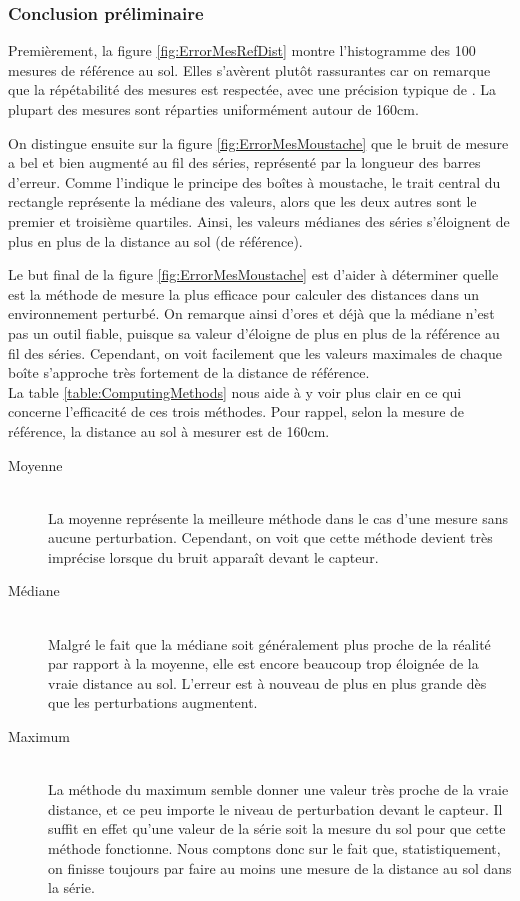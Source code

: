 \subsubsection{Conclusion préliminaire} 

Premièrement, la figure \ref{fig:ErrorMesRefDist} montre l'histogramme des 100 mesures de référence au sol.
Elles s'avèrent plutôt rassurantes car on remarque que la répétabilité des mesures est respectée, avec
une précision typique de \textpm 2cm. La plupart des mesures sont réparties uniformément autour de 160cm.\par
On distingue ensuite sur la figure \ref{fig:ErrorMesMoustache} que le bruit de mesure a bel et bien augmenté
au fil des séries, représenté par la longueur des barres d'erreur. Comme l'indique le principe des boîtes
à moustache, le trait central du rectangle représente la médiane des valeurs, alors que les deux autres
sont le premier et troisième quartiles. Ainsi, les valeurs médianes des séries s'éloignent de plus en 
plus de la distance au sol (de référence).\par
Le but final de la figure \ref{fig:ErrorMesMoustache} est d'aider à déterminer quelle est la méthode
de mesure la plus efficace pour calculer des distances dans un environnement perturbé. On remarque
ainsi d'ores et déjà que la médiane n'est pas un outil fiable, puisque sa valeur d'éloigne de plus en
plus de la référence au fil des séries. Cependant, on voit facilement que les valeurs maximales de chaque
boîte s'approche très fortement de la distance de référence.\\
La table \ref{table:ComputingMethods} nous aide à y voir plus clair en ce qui concerne l'efficacité de ces
trois méthodes. Pour rappel, selon la mesure de référence, la distance au sol à mesurer est de 160cm.

\begin{description}
    \item[Moyenne] \hfill \\ 
    La moyenne représente la meilleure méthode dans le cas d'une mesure sans aucune 
    perturbation. Cependant, on voit que cette méthode devient très imprécise lorsque du bruit
    apparaît devant le capteur.
    \item[Médiane] \hfill \\ 
    Malgré le fait que la médiane soit généralement plus proche de la réalité par rapport 
    à la moyenne, elle est encore beaucoup trop éloignée de la vraie distance au sol. L'erreur est à 
    nouveau de plus en plus grande dès que les perturbations augmentent. 
    \item[Maximum] \hfill \\ 
    La méthode du maximum semble donner une valeur très proche de la vraie distance,
    et ce peu importe le niveau de perturbation devant le capteur. Il suffit en effet qu'une valeur
    de la série soit la mesure du sol pour que cette méthode fonctionne. Nous comptons donc sur le fait 
    que, statistiquement, on finisse toujours par faire au moins une mesure de la distance au sol dans 
    la série.
\end{description}

